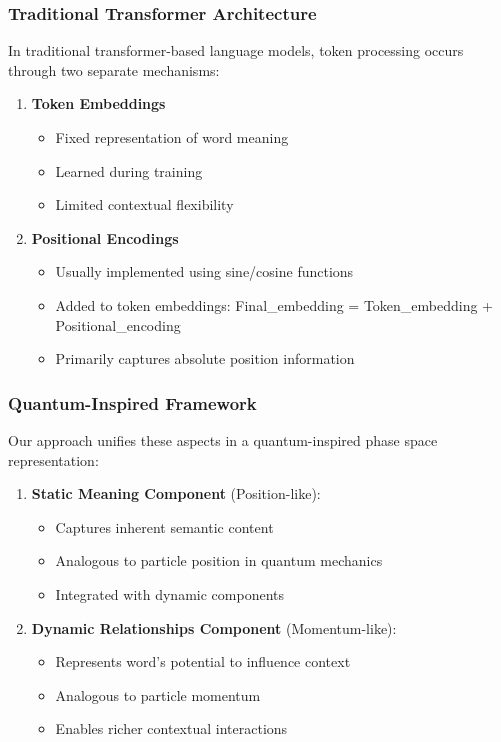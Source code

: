 \documentclass[twocolumn]{article}
\begin{document}
\subsubsection{Traditional Transformer Architecture}
In traditional transformer-based language models, token processing occurs through two separate mechanisms:
\begin{enumerate}
    \item \textbf{Token Embeddings}
    \begin{itemize}
        \item Fixed representation of word meaning
        \item Learned during training
        \item Limited contextual flexibility
    \end{itemize}

    \item \textbf{Positional Encodings}
    \begin{itemize}
        \item Usually implemented using sine/cosine functions
        \item Added to token embeddings: Final\_embedding = Token\_embedding + Positional\_encoding
        \item Primarily captures absolute position information
    \end{itemize}
\end{enumerate}

\subsubsection{Quantum-Inspired Framework}
Our approach unifies these aspects in a quantum-inspired phase space representation:
\begin{enumerate}
    \item \textbf{Static Meaning Component} (Position-like):
    \begin{itemize}
        \item Captures inherent semantic content
        \item Analogous to particle position in quantum mechanics
        \item Integrated with dynamic components
    \end{itemize}

    \item \textbf{Dynamic Relationships Component} (Momentum-like):
    \begin{itemize}
        \item Represents word's potential to influence context
        \item Analogous to particle momentum
        \item Enables richer contextual interactions
    \end{itemize}
\end{enumerate}
\end{document}
